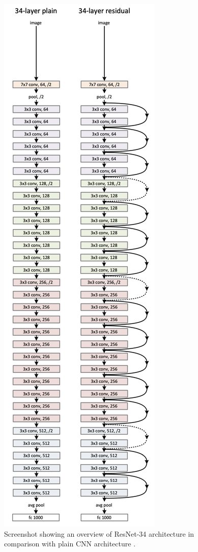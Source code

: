 \documentclass[conference]{IEEEtran}
\begin{document}
    \begin{figure}[ht!]
        \centerline{\includegraphics[scale=0.32]{figures/Screenshot 2021-12-16 at 17.28.47.png}}
        \caption{Screenshot showing an overview of ResNet-34 architecture in comparison with plain CNN architecture \cite{he2016deep}.}

        \label{fig:resnet}
    \end{figure}
    
\end{document}

